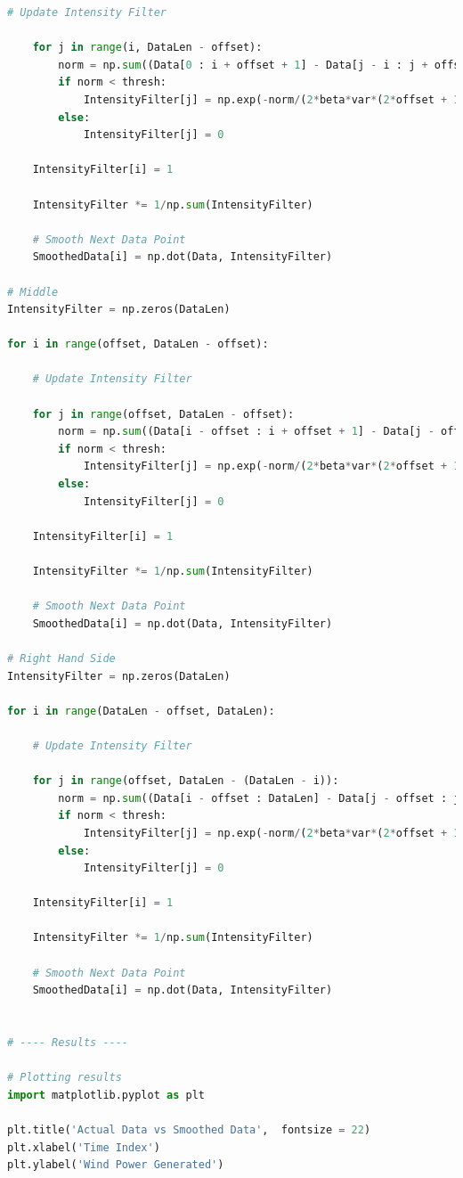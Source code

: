 \documentclass[11pt]{article}
\theoremstyle{definition}
\begin{document}
\begin{lstlisting}[language = Python]
    # Update Intensity Filter

    for j in range(i, DataLen - offset):
        norm = np.sum((Data[0 : i + offset + 1] - Data[j - i : j + offset + 1])**2)
        if norm < thresh:
            IntensityFilter[j] = np.exp(-norm/(2*beta*var*(2*offset + 1)))
        else:
            IntensityFilter[j] = 0

    IntensityFilter[i] = 1

    IntensityFilter *= 1/np.sum(IntensityFilter)

    # Smooth Next Data Point
    SmoothedData[i] = np.dot(Data, IntensityFilter)

# Middle
IntensityFilter = np.zeros(DataLen)

for i in range(offset, DataLen - offset):

    # Update Intensity Filter

    for j in range(offset, DataLen - offset):
        norm = np.sum((Data[i - offset : i + offset + 1] - Data[j - offset : j + offset + 1])**2)
        if norm < thresh:
            IntensityFilter[j] = np.exp(-norm/(2*beta*var*(2*offset + 1)))
        else:
            IntensityFilter[j] = 0

    IntensityFilter[i] = 1

    IntensityFilter *= 1/np.sum(IntensityFilter)

    # Smooth Next Data Point
    SmoothedData[i] = np.dot(Data, IntensityFilter)

# Right Hand Side
IntensityFilter = np.zeros(DataLen)

for i in range(DataLen - offset, DataLen):

    # Update Intensity Filter

    for j in range(offset, DataLen - (DataLen - i)):
        norm = np.sum((Data[i - offset : DataLen] - Data[j - offset : j + (DataLen - i)])**2)
        if norm < thresh:
            IntensityFilter[j] = np.exp(-norm/(2*beta*var*(2*offset + 1)))
        else:
            IntensityFilter[j] = 0

    IntensityFilter[i] = 1

    IntensityFilter *= 1/np.sum(IntensityFilter)

    # Smooth Next Data Point
    SmoothedData[i] = np.dot(Data, IntensityFilter)


# ---- Results ----

# Plotting results
import matplotlib.pyplot as plt

plt.title('Actual Data vs Smoothed Data',  fontsize = 22)
plt.xlabel('Time Index')
plt.ylabel('Wind Power Generated')


\end{lstlisting}
\end{document}
